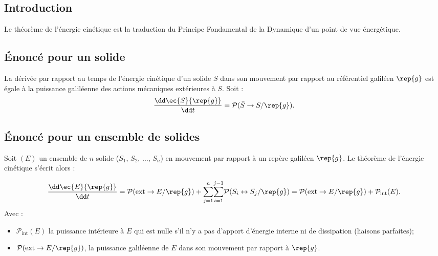 \subsection{Introduction}
Le théorème de l'énergie cinétique est la traduction du Principe Fondamental de la Dynamique d'un point de vue énergétique.
\subsection{Énoncé pour un solide}

\begin{theoreme}
La dérivée par rapport au temps de l'énergie cinétique d'un solide $S$ dans son mouvement par rapport au référentiel galiléen $\rep{g}$ est égale à la puissance galiléenne des actions mécaniques extérieures à $S$.
Soit :
$$
\dfrac{\dd \ec{S}{\rep{g}}}{\dd t}=\mathcal{P}(\bar S \rightarrow S/\rep{g}).
$$

\end{theoreme}


%


\subsection{Énoncé pour un ensemble de solides}

\begin{theoreme}
Soit $(E)$ un ensemble de $n$ solide ($S_1$, $S_2$, $\ldots$, $S_n$) en mouvement par rapport à un repère galiléen $\rep{g}$. Le théorème de l'énergie cinétique s'écrit alors :

$$
\frac{\dd \ec{E}{\rep{g}}}{\dd t}=\mathcal{P}(\text{ext}\rightarrow E/\rep{g})+ \displaystyle{\sum^n_{j=1}}\displaystyle{\sum^{j-1}_{i=1}}\mathcal{P}(S_i \leftrightarrow S_j/\rep{g})=\mathcal{P}(\text{ext}\rightarrow E/\rep{g})+\mathcal{P}_{\text{int}}(E).
$$
Avec :
\begin{itemize}
\item $\mathcal{P}_{\text{int}}(E)$ la puissance intérieure à $E$ qui est nulle s'il n'y a pas d'apport d'énergie interne ni de dissipation (liaisons parfaites);
\item $\mathcal{P}(\text{ext}\rightarrow E/\rep{g})$, la puissance galiléenne de $E$ dans son mouvement par rapport à $\rep{g}$.
\end{itemize}

\end{theoreme}

